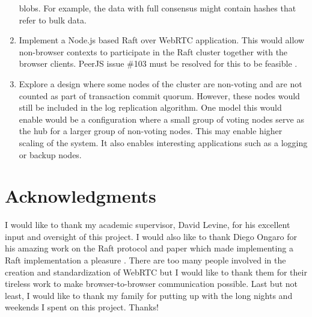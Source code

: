 \documentclass[9pt]{extarticle}
\begin{document}
\begin{multicols}{2}
\begin{enumerate}
    blobs. For example, the data with full consensus might contain
    hashes that refer to bulk data.
\item Implement a Node.js based Raft over WebRTC application. This
    would allow non-browser contexts to participate in the Raft
    cluster together with the browser clients. PeerJS issue \#103 must
    be resolved for this to be feasible \cite{peerjs:103}.
\item Explore a design where some nodes of the cluster are non-voting
    and are not counted as part of transaction commit quorum. However,
    these nodes would still be included in the log replication
    algorithm. One model this would enable would be a configuration
    where a small group of voting nodes serve as the hub for a larger
    group of non-voting nodes. This may enable higher scaling of the
    system. It also enables interesting applications such as a logging
    or backup nodes.
\end{enumerate}


\section*{Acknowledgments}
I would like to thank my academic supervisor, David Levine, for his
excellent input and oversight of this project. I would also like to
thank Diego Ongaro for his amazing work on the Raft protocol and paper
\cite[p.~215]{lamport78} which made implementing
a Raft implementation a pleasure \cite{lamport78}.
There are too many people involved in the creation and standardization
of WebRTC but I would like to thank them for their tireless work to
make browser-to-browser communication possible. Last but not least,
I would like to thank my family for putting up with the long nights
and weekends I spent on this project. Thanks!

\end{multicols}

\printbibliography[title={General references},notkeyword=rtc-general,notkeyword=rtc-transport,notkeyword=rtc-framing]

\nocite{draft-rtcweb-overview}
\nocite{draft-rtcweb-security-arch}
\nocite{draft-rtcweb-security}
\printbibliography[title={WebRTC general references},keyword=rtc-general]

\nocite{draft-rtcweb-transports}
\nocite{draft-rtcweb-qos}
\nocite{RFC4960:sctp}
\nocite{RFC3758:sctp-reliability}
\nocite{draft-sctp-dtls-encaps}
\nocite{draft-mmusic-sctp-sdp}
\nocite{draft-sctp-ndata}
\nocite{draft-rtcweb-rtp-usage}
\nocite{draft-rtcweb-data-channel}
\nocite{draft-rtcweb-data-protocol}
\nocite{draft-rtcweb-alpn}
\nocite{RFC5245:ice}
\nocite{RFC5128:p2p-nat}
\nocite{RFC5389:stun}
\nocite{RFC3489:stun-udp}
\nocite{RFC5766:turn}
\nocite{RFC6156:turn-ipv6}
\nocite{RFC6544:tcp-ice}
\nocite{RFC4571:rtp-rtcp}
\nocite{RFC5764:dtls-srtp}
\printbibliography[title={WebRTC data transport},keyword=rtc-transport]
\end{document}
